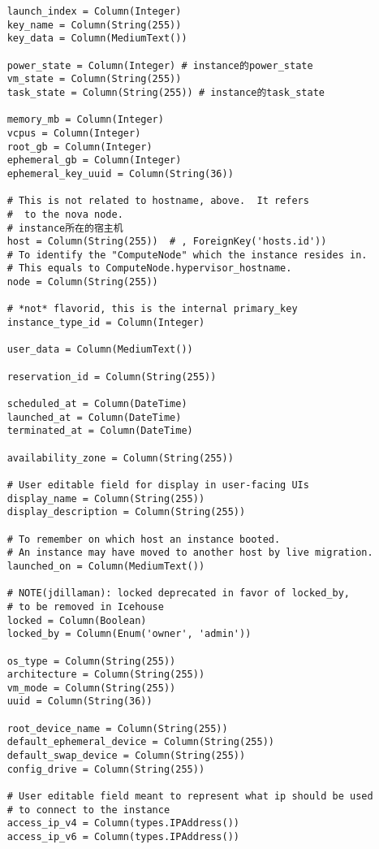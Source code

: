 \documentclass[a4paper,left=1.5cm,right=1.5cm,11pt]{article}
\begin{document}
\begin{lstlisting}
    launch_index = Column(Integer)
    key_name = Column(String(255))
    key_data = Column(MediumText())

    power_state = Column(Integer) # instance的power_state
    vm_state = Column(String(255))
    task_state = Column(String(255)) # instance的task_state

    memory_mb = Column(Integer)
    vcpus = Column(Integer)
    root_gb = Column(Integer)
    ephemeral_gb = Column(Integer)
    ephemeral_key_uuid = Column(String(36))

    # This is not related to hostname, above.  It refers
    #  to the nova node.
    # instance所在的宿主机
    host = Column(String(255))  # , ForeignKey('hosts.id'))
    # To identify the "ComputeNode" which the instance resides in.
    # This equals to ComputeNode.hypervisor_hostname.
    node = Column(String(255))

    # *not* flavorid, this is the internal primary_key
    instance_type_id = Column(Integer)

    user_data = Column(MediumText())

    reservation_id = Column(String(255))

    scheduled_at = Column(DateTime)
    launched_at = Column(DateTime)
    terminated_at = Column(DateTime)

    availability_zone = Column(String(255))

    # User editable field for display in user-facing UIs
    display_name = Column(String(255))
    display_description = Column(String(255))

    # To remember on which host an instance booted.
    # An instance may have moved to another host by live migration.
    launched_on = Column(MediumText())

    # NOTE(jdillaman): locked deprecated in favor of locked_by,
    # to be removed in Icehouse
    locked = Column(Boolean)
    locked_by = Column(Enum('owner', 'admin'))

    os_type = Column(String(255))
    architecture = Column(String(255))
    vm_mode = Column(String(255))
    uuid = Column(String(36))

    root_device_name = Column(String(255))
    default_ephemeral_device = Column(String(255))
    default_swap_device = Column(String(255))
    config_drive = Column(String(255))

    # User editable field meant to represent what ip should be used
    # to connect to the instance
    access_ip_v4 = Column(types.IPAddress())
    access_ip_v6 = Column(types.IPAddress())


\end{lstlisting}
\end{document}
